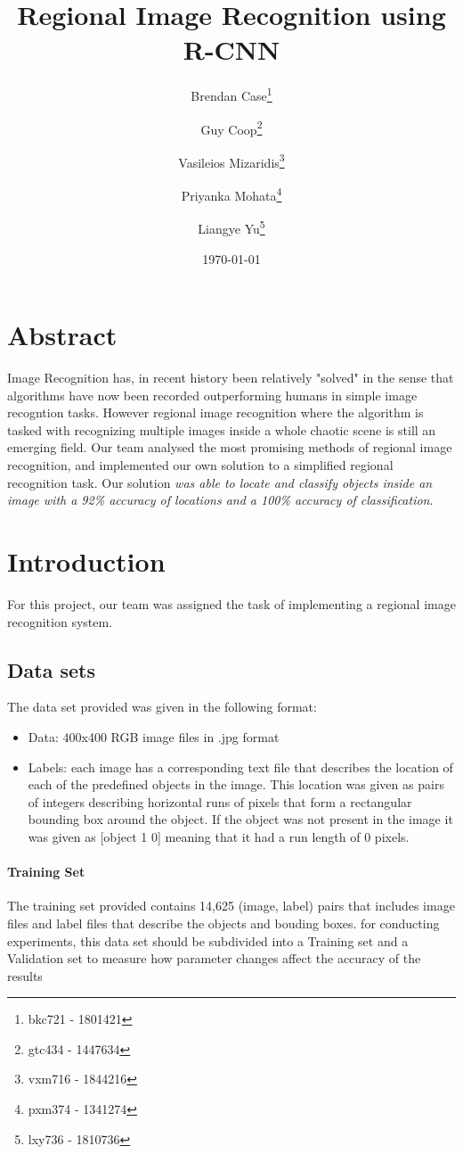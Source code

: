 \documentclass[10pt]{article}
\author{
	Brendan Case{\footnote{bkc721 - 1801421}} 
	\and Guy Coop{\footnote{gtc434 - 1447634}}
	\and Vasileios Mizaridis{\footnote{vxm716 - 1844216}}
	\and Priyanka Mohata{\footnote{pxm374 - 1341274}}
	\and Liangye Yu{\footnote{lxy736 - 1810736}}
	}
\title{Regional Image Recognition using R-CNN}
\date{\today}
\begin{document}
 \maketitle
 
\section*{Abstract}
Image Recognition has, in recent history been relatively "solved" in the sense that algorithms have now been recorded outperforming humans in simple image recogntion tasks. However regional image recognition where the algorithm is tasked with recognizing multiple images inside a whole chaotic scene is still an emerging field. Our team analysed the most promising methods of regional image recognition, and implemented our own solution to a simplified regional recognition task. Our solution {\it was able to locate and classify objects inside an image with a 92\% accuracy of locations and a 100\% accuracy of classification}.


\newpage
\tableofcontents
\newpage

\section{Introduction}
For this project, our team was assigned the task of implementing a regional image recognition system.
\subsection{Data sets}
The data set provided was given in the following format:
\begin{itemize}
	\item Data: 400x400 RGB image files in .jpg format
	\item Labels: each image has a corresponding text file that describes the location of each of the predefined objects in the image. This location was given as pairs of integers describing horizontal runs of pixels that form a rectangular bounding box around the object. If the object was not present in the image it was given as [object 1 0] meaning that it had a run length of 0 pixels.
\end{itemize}
\paragraph{Training Set}
The training set provided contains 14,625 (image, label) pairs that includes image files and label files that describe the objects and bouding boxes. for conducting experiments, this data set should be subdivided into a Training set and a Validation set to measure how parameter changes affect the accuracy of the results
\end{document}
